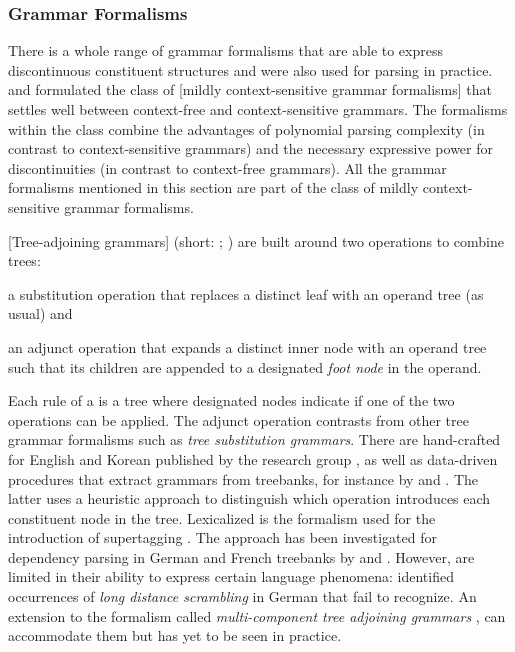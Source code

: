 \documentclass[../document.tex]{subfiles}
\begin{document}
    \subsubsection*{Grammar Formalisms}
    There is a whole range of grammar formalisms that are able to express discontinuous constituent structures and were also used for parsing in practice.
     and \citet{Weir88} formulated the class of [mildly context-sensitive grammar formalisms] that settles well between context-free and context-sensitive grammars.
    The formalisms within the class combine the advantages of polynomial parsing complexity (in contrast to context-sensitive grammars) and the necessary expressive power for discontinuities (in contrast to context-free grammars).
    All the grammar formalisms mentioned in this section are part of the class of mildly context-sensitive grammar formalisms.

    [Tree-adjoining grammars] (short: ; \citealp{JosLevTak75}) are built around two operations to combine trees:
    \begin{compactitem}
        \item a substitution operation that replaces a distinct leaf with an operand tree (as usual) and
        \item an adjunct operation that expands a distinct inner node with an operand tree such that its children are appended to a designated \emph{foot node} in the operand.
    \end{compactitem}
    Each rule of a  is a tree where designated nodes indicate if one of the two operations can be applied.
    The adjunct operation contrasts  from other tree grammar formalisms such as \emph{tree substitution grammars}.
    There are hand-crafted  for English \citep{xtag01} and Korean \citep{xtag02} published by the  research group \citep{Doran99}, as well as data-driven procedures that extract grammars from treebanks, for instance by \citet{xia1999extracting} and \citet{Bla18}.
    The latter uses a heuristic approach to distinguish which operation introduces each constituent node in the tree.
    Lexicalized  is the formalism used for the introduction of supertagging \citep{bangalore1999supertagging}.
    The approach has been investigated for dependency parsing in German and French treebanks by \citet{Kas17} and \citet{Bla18}.
    However,  are limited in their ability to express certain language phenomena: \citet{Becker91} identified occurrences of \emph{long distance scrambling} in German that  fail to recognize.
    An extension to the formalism called \emph{multi-component tree adjoining grammars} \citep{VijWeiJos87,Weir88}, can accommodate them but has yet to be seen in practice.
\end{document}
